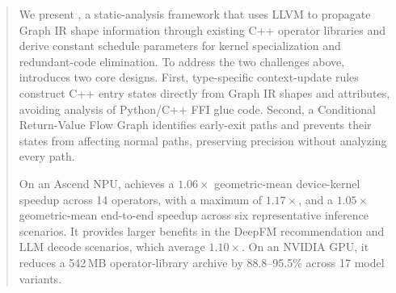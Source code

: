 \begin{abstract}
We present \mysys, a static-analysis framework that uses LLVM to propagate Graph IR shape information through existing C++ operator libraries and derive constant schedule parameters for kernel specialization and redundant-code elimination. To address the two challenges above, \mysys introduces two core designs. First, type-specific context-update rules construct C++ entry states directly from Graph IR shapes and attributes, avoiding analysis of Python/C++ FFI glue code. Second, a Conditional Return-Value Flow Graph identifies early-exit paths and prevents their states from affecting normal paths, preserving precision without analyzing every path.

On an Ascend NPU, \mysys achieves a $1.06\times$ geometric-mean device-kernel speedup across 14 operators, with a maximum of $1.17\times$, and a $1.05\times$ geometric-mean end-to-end speedup across six representative inference scenarios. It provides larger benefits in the DeepFM recommendation and LLM decode scenarios, which average $1.10\times$. On an NVIDIA GPU, it reduces a 542\,MB operator-library archive by 88.8--95.5\% across 17 model variants.
\end{abstract}
